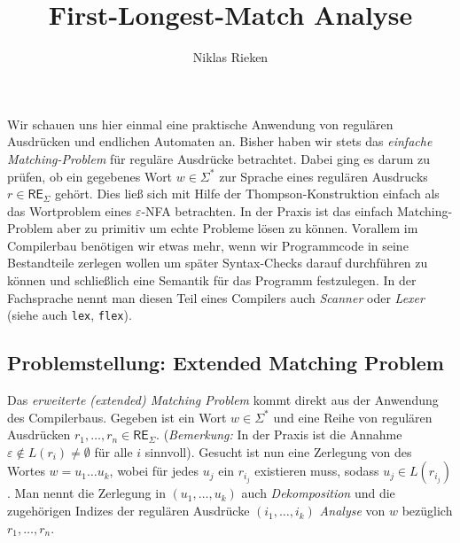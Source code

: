 \documentclass[11pt, a4paper]{article}
\author{Niklas Rieken}
\title{First-Longest-Match Analyse}
\theoremstyle{definition}
\theoremstyle{plain}
\begin{document}
\maketitle

Wir schauen uns hier einmal eine praktische Anwendung von regulären Ausdrücken und endlichen Automaten an. Bisher haben wir stets das \textit{einfache Matching-Problem} für reguläre Ausdrücke betrachtet. Dabei ging es darum zu prüfen, ob ein gegebenes Wort \( w \in \Sigma^\ast \) zur Sprache eines regulären Ausdrucks \( r \in \mathsf{RE}_\Sigma \) gehört. Dies ließ sich mit Hilfe der Thompson-Konstruktion einfach als das Wortproblem eines \(\varepsilon\)-NFA betrachten. In der Praxis ist das einfach Matching-Problem aber zu primitiv um echte Probleme lösen zu können. Vorallem im Compilerbau benötigen wir etwas mehr, wenn wir Programmcode in seine Bestandteile zerlegen wollen um später Syntax-Checks darauf durchführen zu können und schließlich eine Semantik für das Programm festzulegen. In der Fachsprache nennt man diesen Teil eines Compilers auch \textit{Scanner} oder \textit{Lexer} (siehe auch \texttt{lex}, \texttt{flex}).


\subsection*{Problemstellung: Extended Matching Problem}
Das \textit{erweiterte (extended) Matching Problem} kommt direkt aus der Anwendung des Compilerbaus. Gegeben ist ein Wort \( w \in \Sigma^\ast \) und eine Reihe von regulären Ausdrücken \( r_1, \ldots, r_n \in \mathsf{RE}_\Sigma \). (\textit{Bemerkung:} In der Praxis ist die Annahme \( \varepsilon \notin L(r_i) \neq \emptyset \) für alle \( i \) sinnvoll). Gesucht ist nun eine Zerlegung von des Wortes \( w = u_1 \ldots u_k \), wobei für jedes \( u_j \) ein \( r_{i_j} \) existieren muss, sodass \( u_j \in L(r_{i_j}) \). Man nennt die Zerlegung in \( (u_1, \ldots, u_k) \) auch \textit{Dekomposition} und die zugehörigen Indizes der regulären Ausdrücke \( (i_1, \ldots, i_k) \) \textit{Analyse} von \( w \) bezüglich \( r_1, \ldots, r_n \).
\end{document}
